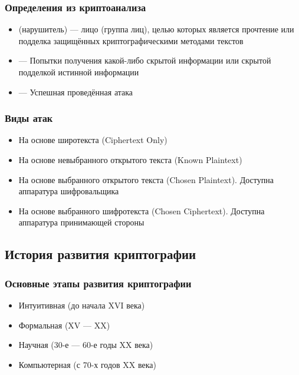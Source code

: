 \documentclass[a4paper, 14pt]{extarticle}
\begin{document}
\subsubsection*{Определения из криптоанализа}
\begin{itemize}
    \item {} (нарушитель) --- лицо (группа лиц), целью которых является прочтение или подделка защищённых криптографическими методами текстов
    \item {} --- Попытки получения какой-либо скрытой информации или скрытой подделкой истинной информации
    \item {} --- Успешная проведённая атака
\end{itemize}

\subsubsection*{Виды атак}
\begin{itemize}
    \item На основе широтекста (Ciphertext Only)
    \item На основе невыбранного открытого текста (Known Plaintext)
    \item На основе выбранного открытого текста (Chosen Plaintext). Доступна аппаратура шифровальщика
    \item На основе выбранного шифротекста (Chosen Ciphertext). Доступна аппаратура принимающей стороны
\end{itemize}

\subsection{История развития криптографии}
\subsubsection*{Основные этапы развития криптографии}
\begin{itemize}
    \item Интуитивная (до начала XVI века)
    \item Формальная (XV --- XX)
    \item Научная (30-е --- 60-е годы XX века)
    \item Компьютерная (с 70-х годов XX века)
\end{itemize}

\end{document}
